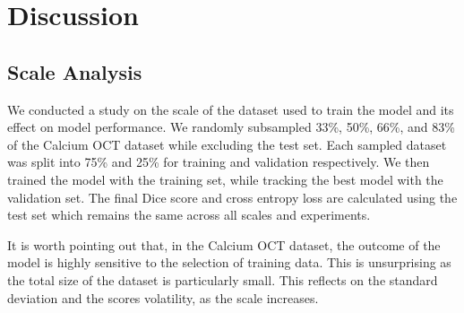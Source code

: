 \documentclass[a4paper,11pt,oneside]{report}
\begin{document}
\section{Discussion}
\subsection{Scale Analysis}
We conducted a study on the scale of the dataset used to train the model and its effect on model performance. We randomly subsampled 33\%, 50\%, 66\%, and 83\% of the Calcium OCT dataset while excluding the test set. Each sampled dataset was split into 75\% and 25\% for training and validation respectively. We then trained the model with the training set, while tracking the best model with the validation set. The final Dice score and cross entropy loss are calculated using the test set which remains the same across all scales and experiments.

It is worth pointing out that, in the Calcium OCT dataset, the outcome of the model is highly sensitive to the selection of training data. This is unsurprising as the total size of the dataset is particularly small. This reflects on the standard deviation and the scores volatility, as the scale increases.
\end{document}
